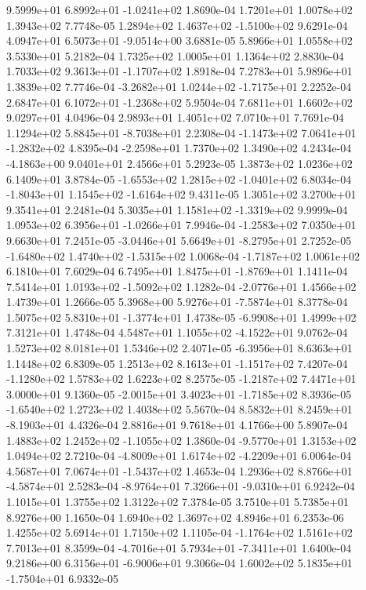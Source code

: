  9.5999e+01  6.8992e+01 -1.0241e+02  1.8690e-04
1.7201e+01 1.0078e+02 1.3943e+02  7.7748e-05
 1.2894e+02  1.4637e+02 -1.5100e+02  9.6291e-04
 4.0947e+01  6.5073e+01 -9.0514e+00  3.6881e-05
5.8966e+01 1.0558e+02 3.5330e+01  5.2182e-04
1.7325e+02 1.0005e+01 1.1364e+02  2.8830e-04
 1.7033e+02  9.3613e+01 -1.1707e+02  1.8918e-04
7.2783e+01 5.9896e+01 1.3839e+02  7.7746e-04
-3.2682e+01  1.0244e+02 -1.7175e+01  2.2252e-04
 2.6847e+01  6.1072e+01 -1.2368e+02  5.9504e-04
7.6811e+01 1.6602e+02 9.0297e+01  4.0496e-04
2.9893e+01 1.4051e+02 7.0710e+01  7.7691e-04
 1.1294e+02  5.8845e+01 -8.7038e+01  2.2308e-04
-1.1473e+02  7.0641e+01 -1.2832e+02  4.8395e-04
-2.2598e+01  1.7370e+02  1.3490e+02  4.2434e-04
-4.1863e+00  9.0401e+01  2.4566e+01  5.2923e-05
1.3873e+02 1.0236e+02 6.1409e+01  3.8784e-05
-1.6553e+02  1.2815e+02 -1.0401e+02  6.8034e-04
-1.8043e+01  1.1545e+02 -1.6164e+02  9.4311e-05
1.3051e+02 3.2700e+01 9.3541e+01  2.2481e-04
 5.3035e+01  1.1581e+02 -1.3319e+02  9.9999e-04
 1.0953e+02  6.3956e+01 -1.0266e+01  7.9946e-04
-1.2583e+02  7.0350e+01  9.6630e+01  7.2451e-05
-3.0446e+01  5.6649e+01 -8.2795e+01  2.7252e-05
-1.6480e+02  1.4740e+02 -1.5315e+02  1.0068e-04
-1.7187e+02  1.0061e+02  6.1810e+01  7.6029e-04
 6.7495e+01  1.8475e+01 -1.8769e+01  1.1411e-04
 7.5414e+01  1.0193e+02 -1.5092e+02  1.1282e-04
-2.0776e+01  1.4566e+02  1.4739e+01  1.2666e-05
 5.3968e+00  5.9276e+01 -7.5874e+01  8.3778e-04
 1.5075e+02  5.8310e+01 -1.3774e+01  1.4738e-05
-6.9908e+01  1.4999e+02  7.3121e+01  1.4748e-04
 4.5487e+01  1.1055e+02 -4.1522e+01  9.0762e-04
1.5273e+02 8.0181e+01 1.5346e+02  2.4071e-05
-6.3956e+01  8.6363e+01  1.1448e+02  6.8309e-05
 1.2513e+02  8.1613e+01 -1.1517e+02  7.4207e-04
-1.1280e+02  1.5783e+02  1.6223e+02  8.2575e-05
-1.2187e+02  7.4471e+01  3.0000e+01  9.1360e-05
-2.0015e+01  3.4023e+01 -1.7185e+02  8.3936e-05
-1.6540e+02  1.2723e+02  1.4038e+02  5.5670e-04
 8.5832e+01  8.2459e+01 -8.1903e+01  4.4326e-04
2.8816e+01 9.7618e+01 4.1766e+00  5.8907e-04
 1.4883e+02  1.2452e+02 -1.1055e+02  1.3860e-04
-9.5770e+01  1.3153e+02  1.0494e+02  2.7210e-04
-4.8009e+01  1.6174e+02 -4.2209e+01  6.0064e-04
 4.5687e+01  7.0674e+01 -1.5437e+02  1.4653e-04
 1.2936e+02  8.8766e+01 -4.5874e+01  2.5283e-04
-8.9764e+01  7.3266e+01 -9.0310e+01  6.9242e-04
1.1015e+01 1.3755e+02 1.3122e+02  7.3784e-05
3.7510e+01 5.7385e+01 8.9276e+00  1.1650e-04
1.6940e+02 1.3697e+02 4.8946e+01  6.2353e-06
1.4255e+02 5.6914e+01 1.7150e+02  1.1105e-04
-1.1764e+02  1.5161e+02  7.7013e+01  8.3599e-04
-4.7016e+01  5.7934e+01 -7.3411e+01  1.6400e-04
 9.2186e+00  6.3156e+01 -6.9006e+01  9.3066e-04
 1.6002e+02  5.1835e+01 -1.7504e+01  6.9332e-05
